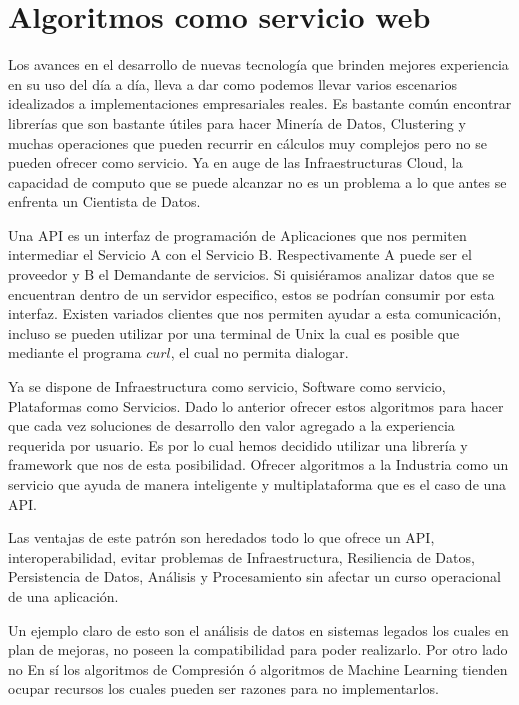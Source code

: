 \section{Algoritmos como servicio web }

	Los avances en el desarrollo de nuevas tecnología que brinden mejores experiencia en su uso del día a día, lleva a dar como podemos llevar varios escenarios idealizados a implementaciones empresariales reales. Es bastante común encontrar librerías que son bastante útiles para hacer Minería de Datos, Clustering y muchas operaciones que pueden recurrir en cálculos muy complejos pero no se pueden ofrecer como servicio. Ya en auge de las Infraestructuras Cloud, la capacidad de computo que se puede alcanzar no es un problema a lo que antes se enfrenta un Cientista de Datos.


	Una API es un interfaz de programación de Aplicaciones que nos permiten intermediar el Servicio A con el Servicio B. Respectivamente A puede ser el proveedor y B el Demandante de servicios. Si quisiéramos analizar datos que se encuentran dentro de un servidor especifico, estos se podrían consumir por esta interfaz. Existen variados clientes que nos permiten ayudar a esta comunicación, incluso se pueden utilizar por una terminal de Unix la cual es posible que mediante el programa $curl$, el cual no permita dialogar.
	
	Ya se dispone de Infraestructura como servicio, Software como servicio, Plataformas como Servicios. Dado lo anterior ofrecer estos algoritmos para hacer que cada vez soluciones de desarrollo den valor agregado a la experiencia requerida por usuario. 
	Es por lo cual hemos decidido utilizar una librería y framework que nos de esta posibilidad. Ofrecer algoritmos a la Industria como un servicio que ayuda de manera inteligente y multiplataforma  que es el caso de una API. 
	
	Las ventajas de este patrón son heredados  todo lo que ofrece un API, interoperabilidad, evitar problemas de Infraestructura, Resiliencia de Datos, Persistencia de Datos, Análisis y Procesamiento sin afectar un curso operacional de una aplicación.
	
	Un ejemplo claro de esto son el análisis de datos en sistemas legados los cuales en plan de mejoras, no poseen la compatibilidad para poder realizarlo. Por otro lado no En sí los algoritmos de Compresión ó algoritmos de Machine Learning tienden ocupar recursos los cuales pueden ser razones para no implementarlos.
	
	
	
	